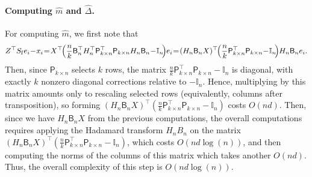 \documentclass[11pt]{article}
\theoremstyle{definition}
\theoremstyle{plain}
\providecommand{\brI}{\mathbb{I}}
\begin{document}
    \paragraph{Computing $\widehat{m}$ and $\widehat{\Delta}$.} 
    For computing $\widehat{m}$, we first note that 
    \begin{align}
        Z^{\top}S_{\mathrm{f}}e_i \hspace{-0.2em}-\hspace{-0.2em} x_i \hspace{-0.2em}=\hspace{-0.2em}X^{\top}\hspace{-0.3em}\left(\frac{n}{k} \mathsf{B}^{\top}_nH^{\top}_n\mathsf{P}^{\top}_{k\times n}\mathsf{P}_{k\times n}H_n\mathsf{B}_n \hspace{-0.2em}-\hspace{-0.2em} \brI_n\hspace{-0.2em}\right)\hspace{-0.2em}e_i \hspace{-0.2em}=\hspace{-0.2em} (H_n\mathsf{B}_nX)^{\top}\hspace{-0.3em}\left(\frac{n}{k} \mathsf{P}^{\top}_{k\times n}\mathsf{P}_{k\times n} \hspace{-0.2em}-\hspace{-0.2em} \brI_n\hspace{-0.2em}\right)\hspace{-0.2em}H_n\mathsf{B}_ne_i.
    \end{align}
    Then, since \(\mathsf P_{k\times n}\) selects \(k\) rows, the matrix $\frac{n}{k}\mathsf P_{k\times n}^{\top}\mathsf P_{k\times n}-\brI_n$ is diagonal, with exactly \(k\) nonzero diagonal corrections relative to \(-\brI_n\). Hence, multiplying by this matrix amounts only to rescaling selected rows (equivalently, columns after transposition), so forming $(H_n\mathsf B_nX)^{\top}\!\left(\frac{n}{k}\mathsf P_{k\times n}^{\top}\mathsf P_{k\times n}-\brI_n\right)$ costs \(O(nd)\). Then, since we have $H_n\mathsf{B}_nX$ from the previous computations, the overall computations requires applying the Hadamard transform $H_nB_n$ on the matrix $(H_n\mathsf{B}_nX)^{\top}\left(\frac{n}{k} \mathsf{P}^{\top}_{k\times n}\mathsf{P}_{k\times n} - \brI_n\right)$, which costs $O(nd\log(n))$, and then computing the norms of the columns of this matrix which takes another $O(nd)$. Thus, the overall complexity of this step is $O(nd\log(n))$. 
    
\end{document}
